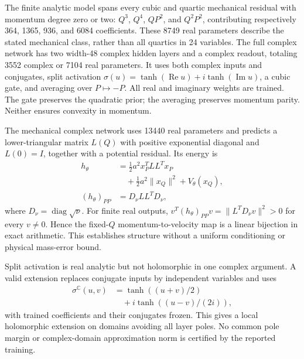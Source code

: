 The finite analytic model spans every cubic and quartic mechanical residual with momentum degree zero or two: $Q^3$, $Q^4$, $QP^2$, and $Q^2P^2$, contributing respectively 364, 1365, 936, and 6084 coefficients. These 8749 real parameters describe the stated mechanical class, rather than all quartics in 24 variables. The full complex network has two width-48 complex hidden layers and a complex readout, totaling 3552 complex or 7104 real parameters. It uses both complex inputs and conjugates, split activation $\sigma(u)=\tanh(\operatorname{Re}u)+i\tanh(\operatorname{Im}u)$, a cubic gate, and averaging over $P\mapsto-P$. All real and imaginary weights are trained. The gate preserves the quadratic prior; the averaging preserves momentum parity. Neither ensures convexity in momentum.

The mechanical complex network uses 13440 real parameters and predicts a lower-triangular matrix $L(Q)$ with positive exponential diagonal and $L(0)=I$, together with a potential residual. Its energy is
\begin{equation}
 \begin{aligned}
 h_\theta&=\tfrac12a^2x_P^TLL^Tx_P\\
 &\quad+\tfrac12a^2\|x_Q\|^2+V_\theta(x_Q),\\
 (h_\theta)_{PP}&=D_\nu LL^TD_\nu,
 \end{aligned}
 \label{eq:learn-spd}
\end{equation}
where $D_\nu=\operatorname{diag}\sqrt\nu$. For finite real outputs, $v^T(h_\theta)_{PP}v=\|L^TD_\nu v\|^2>0$ for every $v\ne0$. Hence the fixed-$Q$ momentum-to-velocity map is a linear bijection in exact arithmetic. This establishes structure without a uniform conditioning or physical mass-error bound.

Split activation is real analytic but not holomorphic in one complex argument. A valid extension replaces conjugate inputs by independent variables and uses
\begin{equation}
 \begin{aligned}
 \sigma^{\mathbb C}(u,v)&=\tanh((u+v)/2)\\
 &\quad+i\tanh((u-v)/(2i)),
 \end{aligned}
 \label{eq:learn-analytic-extension}
\end{equation}
with trained coefficients and their conjugates frozen. This gives a local holomorphic extension on domains avoiding all layer poles. No common pole margin or complex-domain approximation norm is certified by the reported training.

